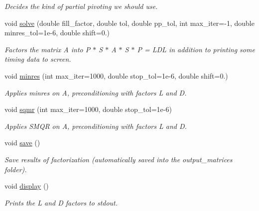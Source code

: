 \begin{DoxyCompactItemize}
\begin{DoxyCompactList}\small\item\em Decides the kind of partial pivoting we should use. \end{DoxyCompactList}\item 
void \hyperlink{classsymildl_1_1solver_a44c23c308722f38a79f6d69c42dd1cd3}{solve} (double fill\+\_\+factor, double tol, double pp\+\_\+tol, int max\+\_\+iter=-\/1, double minres\+\_\+tol=1e-\/6, double shift=0.)
\begin{DoxyCompactList}\small\item\em Factors the matrix A into P\textquotesingle{} $\ast$ S $\ast$ A $\ast$ S $\ast$ P = L\+DL\textquotesingle{} in addition to printing some timing data to screen. \end{DoxyCompactList}\item 
void \hyperlink{classsymildl_1_1solver_acda4c8dde0ee2dc6b42b771f5b08d865}{minres} (int max\+\_\+iter=1000, double stop\+\_\+tol=1e-\/6, double shift=0.)
\begin{DoxyCompactList}\small\item\em Applies minres on A, preconditioning with factors L and D. \end{DoxyCompactList}\item 
void \hyperlink{classsymildl_1_1solver_afd5d8152417cfafd702bee10556d0259}{sqmr} (int max\+\_\+iter=1000, double stop\+\_\+tol=1e-\/6)
\begin{DoxyCompactList}\small\item\em Applies S\+M\+QR on A, preconditioning with factors L and D. \end{DoxyCompactList}\item 
void \hyperlink{classsymildl_1_1solver_aec55eb22870f4e72e99e717ca4e8776f}{save} ()
\begin{DoxyCompactList}\small\item\em Save results of factorization (automatically saved into the output\+\_\+matrices folder). \end{DoxyCompactList}\item 
void \hyperlink{classsymildl_1_1solver_ae714f280567437adeb37bdf45586cf4f}{display} ()\hypertarget{classsymildl_1_1solver_ae714f280567437adeb37bdf45586cf4f}{}\label{classsymildl_1_1solver_ae714f280567437adeb37bdf45586cf4f}

\begin{DoxyCompactList}\small\item\em Prints the L and D factors to stdout. \end{DoxyCompactList}\end{DoxyCompactItemize}
